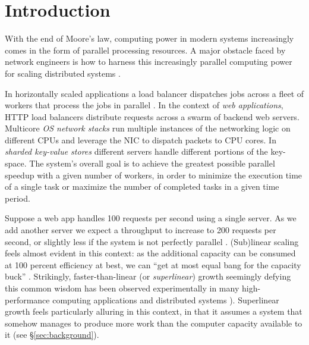 \section{Introduction}\label{sec:introduction}

With the end of Moore's law, computing power in modern systems increasingly comes in the form of parallel processing resources.  A major obstacle faced by network engineers is how to harness this increasingly parallel computing power for scaling distributed systems \cite{265065, 10.5555/3307441.3307467, 10.1145/2815400.2815423, 10.1145/3098822.3098826, 10.5555/3154630.3154639}.

In horizontally scaled applications a load balancer dispatches jobs across a fleet of workers that process the jobs in parallel \cite{10.5555/3235491}.  In the context of \emph{web applications}, HTTP load balancers \cite{194966, 211279, 9552525} distribute requests across a swarm of backend web servers.  %
Multicore \emph{OS network stacks} \cite{211263, 10.1145/3359989.3365412, 10.1145/3452296.3472914} run multiple instances of the networking logic on different CPUs and leverage the NIC to dispatch packets to CPU cores. %
In \emph{sharded key-value stores} \cite{ghigoff2021bmc} different servers handle different portions of the key-space.  The system's overall goal is to achieve the greatest possible parallel speedup with a given number of workers, in order to minimize the execution time of a single task or maximize the number of completed tasks in a given time period.

Suppose a web app handles 100 requests per second using a single server. As we add another server we expect a throughput to increase to 200 requests per second, or slightly less if the system is not perfectly parallel \cite{10.1145/1465482.1465560}. (Sub)linear scaling feels almost evident in this context: as the additional capacity can be consumed at 100 percent efficiency at best, we can ``get at most equal bang for the capacity buck'' \cite{10.1145/2773212.2789974}. Strikingly, faster-than-linear (or \emph{superlinear}) growth seemingly defying this common wisdom has been observed experimentally in many high-performance computing applications and distributed systems \cite{scalability-analyzed, 10.5555/1012889.1012894, 271208, icsoft20, sdn-analytitcs, 556383, 6483679, 10.1007/978-3-319-77610-1, dobb-1, dobb-2, 10.1145/3627703.3629574, 7733347, 80148}).  Superlinear growth feels particularly alluring in this context, in that it assumes a system that somehow manages to produce more work than the computer capacity available to it \cite{10.1145/2773212.2789974} (see \S\ref{sec:background}).

